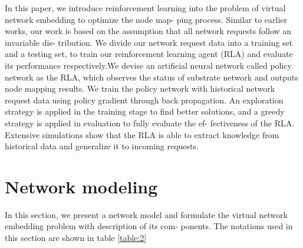 \documentclass[12pt]{article}
\begin{document}
In this paper, we introduce reinforcement learning into the
problem of virtual network embedding to optimize the node map-
ping process. Similar to earlier works, our work is based on
the assumption that all network requests follow an invariable dis-
tribution. We divide our network request data into a training set and a testing set, to train our reinforcement learning agent (RLA)
and evaluate its performance respectively.We devise an artificial
neural network called policy network as the RLA, which observes
the status of substrate network and outputs node mapping results.
We train the policy network with historical network request data
using policy gradient through back propagation. An exploration
strategy is applied in the training stage to find better solutions, and
a greedy strategy is applied in evaluation to fully evaluate the ef-
fectiveness of the RLA. Extensive simulations show that the RLA is
able to extract knowledge from historical data and generalize it to
incoming requests.
\section{Network modeling}
In this section, we present a network model and formulate the
virtual network embedding problem with description of its com-
ponents. The notations used in this section are shown in table \ref{table:2}
\end{document}
